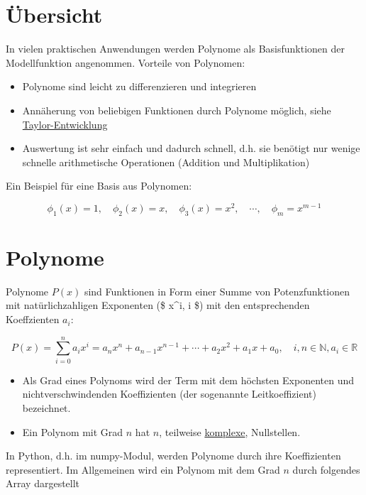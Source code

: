 \documentclass[
  letterpaper,
  DIV=11,
  numbers=noendperiod]{scrreprt}
\providecommand{\tightlist}{%
  \setlength{\itemsep}{0pt}\setlength{\parskip}{0pt}}\usepackage{longtable,booktabs,array}
\begin{document}
\section{Übersicht}\label{uxfcbersicht-1}

In vielen praktischen Anwendungen werden Polynome als Basisfunktionen
der Modellfunktion angenommen. Vorteile von Polynomen:

\begin{itemize}
\tightlist
\item
  Polynome sind leicht zu differenzieren und integrieren
\item
  Annäherung von beliebigen Funktionen durch Polynome möglich, siehe
  \href{https://de.wikipedia.org/wiki/Taylorreihe}{Taylor-Entwicklung}
\item
  Auswertung ist sehr einfach und dadurch schnell, d.h. sie benötigt nur
  wenige schnelle arithmetische Operationen (Addition und
  Multiplikation)
\end{itemize}

Ein Beispiel für eine Basis aus Polynomen:

\[ \phi_1(x)=1,\quad \phi_2(x)=x,\quad \phi_3(x)=x^2,\quad \cdots,\quad \phi_m =x^{m-1} \]

\section{Polynome}\label{polynome}

Polynome \(P(x)\) sind Funktionen in Form einer Summe von
Potenzfunktionen mit natürlichzahligen Exponenten (\$ x\^{}i, i
\in {}\$) mit den entsprechenden Koeffzienten \(a_i\):

\[ P(x) = \sum_{i=0}^n a_i x^i = a_n x^n + a_{n-1} x^{n-1} + \cdots + a_2 x^2 + a_1 x + a_0, \quad i, n \in \mathbb{N}, a_i \in \mathbb{R} \]

\begin{itemize}
\tightlist
\item
  Als Grad eines Polynoms wird der Term mit dem höchsten Exponenten und
  nichtverschwindenden Koeffizienten (der sogenannte Leitkoeffizient)
  bezeichnet.
\item
  Ein Polynom mit Grad \(n\) hat \(n\), teilweise
  \href{https://de.wikipedia.org/wiki/Komplexe_Zahl}{komplexe},
  Nullstellen.
\end{itemize}

In Python, d.h. im numpy-Modul, werden Polynome durch ihre Koeffizienten
representiert. Im Allgemeinen wird ein Polynom mit dem Grad \(n\) durch
folgendes Array dargestellt
\end{document}
